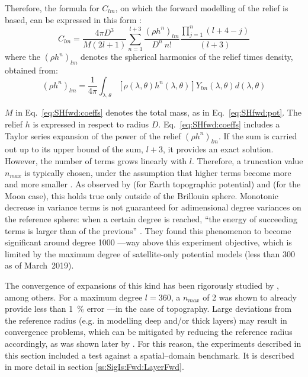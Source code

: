 Therefore, the formula for $C_{lm}$, on which the forward modelling of the relief is based, can be expressed in this form \parencite{Wieczorek2007}:
\begin{equation}
    \label{eq:SHfwd:coeffs}
    C_{lm} =
    \frac{4 \pi D^3}{M(2l+1)}
    \sum_{n=1}^{l+3}
    \frac{(\rho h^n)_{lm}}{D^n \ n!}
    \frac{\prod_{j=1}^{n}(l+4-j)}{(l+3)}
\end{equation}
where the $(\rho h^n)_{lm}$ denotes the spherical harmonics of the relief times density, obtained from:
\begin{equation}
    \label{eq:SHfwd:reliefSH}
    (\rho h^n)_{lm} =
    \frac{1}{4 \pi}
    \int_{\lambda, \theta}
    \left[ \rho(\lambda, \theta) h^n(\lambda, \theta) \right]
    Y_{lm}(\lambda, \theta) d(\lambda, \theta)
\end{equation}

$M$ in Eq.~\ref{eq:SHfwd:coeffs} denotes the total mass, as in Eq.~\ref{eq:SHfwd:pot}.
The relief $h$ is expressed in respect to radius $D$.
Eq.~\ref{eq:SHfwd:coeffs} includes a Taylor series expansion of the power of the relief $(\rho h^n)_{lm}$.
If the sum is carried out up to its upper bound of the sum, $l+3$, it provides an exact solution.
However, the number of terms grows linearly with $l$.
Therefore, a truncation value $n_{max}$ is typically chosen, under the assumption that higher terms become more and more smaller \parencite{Wieczorek2007}.
As observed by \textcite{Balmino2012} (for Earth topographic potential) and \textcite{Hirt2017} (for the Moon case), this holds true only outside of the Brillouin sphere. Monotonic decrease in variance terms is not guaranteed for adimensional degree variances on the reference sphere: when a certain degree is reached, ``the energy of succeeding terms is larger than of the previous'' \parencite{Hirt2017}. They found this phenomenon to become significant around degree \num{1000} ---way above this experiment objective, which is limited by the maximum degree of satellite-only potential models (less than \num{300} as of March~2019).

The convergence of expansions of this kind has been rigorously studied by \textcite{Sun2001}, among others.
For a maximum degree $l = \num{360}$, a $n_{max}$ of \num{2} was shown to already provide less than \SI{1}{\percent} error ---in the case of topography.
Large deviations from the reference radius (e.g. in modelling deep and/or thick layers) may result in convergence problems, which can be mitigated by reducing the reference radius accordingly, as was shown later by \textcite{Root2015}.
For this reason, the experiments described in this section included a test against a spatial--domain benchmark.
It is described in more detail in section \ref{ss:SigIs:Fwd:LayerFwd}.

